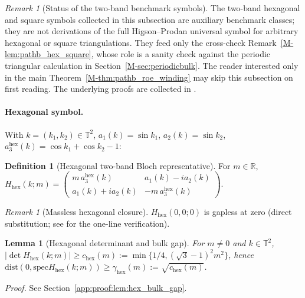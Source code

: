 \documentclass[11pt]{article}
\numberwithin{equation}{section}
\newtheorem{lemma}[theorem]{Lemma}
\theoremstyle{definition}
\newtheorem{definition}[theorem]{Definition}
\theoremstyle{remark}
\newtheorem{remark}[theorem]{Remark}
\newcommand{\proofref}[1]{%
  \par\noindent\emph{Proof.} See Section~\ref{#1}.\par\medskip
}
\newcommand{\proofappendixref}[1]{\proofref{#1}}
\newcommand{\spec}{\mathrm{spec}}
\newcommand{\dist}{\mathrm{dist}}
\newcommand{\hexagon}{\mathrm{hex}}
\begin{document}
\begin{remark}[Status of the two-band benchmark symbols]\label{rem:two_band_benchmarks}
The two-band hexagonal and square symbols collected in this subsection are auxiliary benchmark
classes; they are not derivations of the full Higson--Prodan universal symbol for arbitrary
hexagonal or square triangulations. They feed only the cross-check
Remark~\ref{M-lem:pathb_hex_square}, whose role is a sanity check against the periodic triangular
calculation in Section~\ref{M-sec:periodicbulk}. The reader interested only in the main
Theorem~\ref{M-thm:pathb_roe_winding} may skip this subsection on first reading. The underlying
proofs are collected in
.
\end{remark}

\paragraph{Hexagonal symbol.}
With \(k=(k_1,k_2)\in\mathbb T^2\), \(a_1(k)=\sin k_1\), \(a_2(k)=\sin k_2\),
\(a_3^{\hexagon}(k)=\cos k_1+\cos k_2-1\):

\begin{definition}[Hexagonal two-band Bloch representative]\label{def:hex_bloch_symbol}
For \(m\in\mathbb R\),
\(H_{\hexagon}(k;m)=
\begin{pmatrix} m\,a_3^{\hexagon}(k) & a_1(k)-i a_2(k)\\ a_1(k)+i a_2(k) & -m\,a_3^{\hexagon}(k)\end{pmatrix}\).
\end{definition}

\begin{remark}[Massless hexagonal closure]\label{lem:hex_massless_closure}
\(H_{\hexagon}(0,0;0)\) is gapless at zero (direct substitution; see
 for the one-line verification).
\end{remark}

\begin{lemma}[Hexagonal determinant and bulk gap]\label{lem:hex_bulk_gap}
For \(m\ne0\) and \(k\in\mathbb T^2\),
\(|\det H_{\hexagon}(k;m)|\ge c_{\hexagon}(m):=\min\{1/4,(\sqrt{3}-1)^2m^2\}\), hence
\(\dist(0,\spec H_{\hexagon}(k;m))\ge \gamma_{\hexagon}(m):=\sqrt{c_{\hexagon}(m)}\).
\end{lemma}
\proofappendixref{app:proof:lem:hex_bulk_gap}
\end{document}
